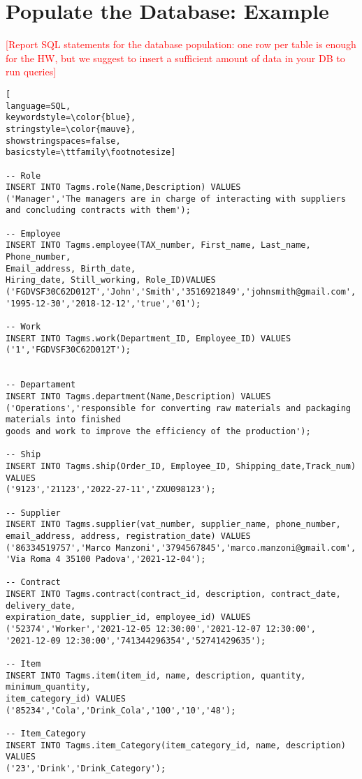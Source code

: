 
\section{Populate the Database: Example}
\textcolor{red}{[Report SQL statements for the database population: one row per table is enough for the HW, but we suggest to insert a sufficient amount of data in your DB to run queries]}


\begin{lstlisting}[
language=SQL,
keywordstyle=\color{blue},
stringstyle=\color{mauve},
showstringspaces=false,
basicstyle=\ttfamily\footnotesize]

-- Role
INSERT INTO Tagms.role(Name,Description) VALUES 
('Manager','The managers are in charge of interacting with suppliers
and concluding contracts with them');

-- Employee
INSERT INTO Tagms.employee(TAX_number, First_name, Last_name, Phone_number,
Email_address, Birth_date,
Hiring_date, Still_working, Role_ID)VALUES
('FGDVSF30C62D012T','John','Smith','3516921849','johnsmith@gmail.com',
'1995-12-30','2018-12-12','true','01');

-- Work
INSERT INTO Tagms.work(Department_ID, Employee_ID) VALUES 
('1','FGDVSF30C62D012T');


-- Departament
INSERT INTO Tagms.department(Name,Description) VALUES
('Operations','responsible for converting raw materials and packaging materials into finished
goods and work to improve the efficiency of the production');

-- Ship
INSERT INTO Tagms.ship(Order_ID, Employee_ID, Shipping_date,Track_num) VALUES 
('9123','21123','2022-27-11','ZXU098123');

-- Supplier
INSERT INTO Tagms.supplier(vat_number, supplier_name, phone_number, 
email_address, address, registration_date) VALUES
('86334519757','Marco Manzoni','3794567845','marco.manzoni@gmail.com',
'Via Roma 4 35100 Padova','2021-12-04');

-- Contract
INSERT INTO Tagms.contract(contract_id, description, contract_date, delivery_date, 
expiration_date, supplier_id, employee_id) VALUES 
('52374','Worker','2021-12-05 12:30:00','2021-12-07 12:30:00',
'2021-12-09 12:30:00','741344296354','52741429635');

-- Item
INSERT INTO Tagms.item(item_id, name, description, quantity, minimum_quantity, 
item_category_id) VALUES 
('85234','Cola','Drink_Cola','100','10','48');

-- Item_Category
INSERT INTO Tagms.item_Category(item_category_id, name, description) VALUES
('23','Drink','Drink_Category');


\end{lstlisting}
